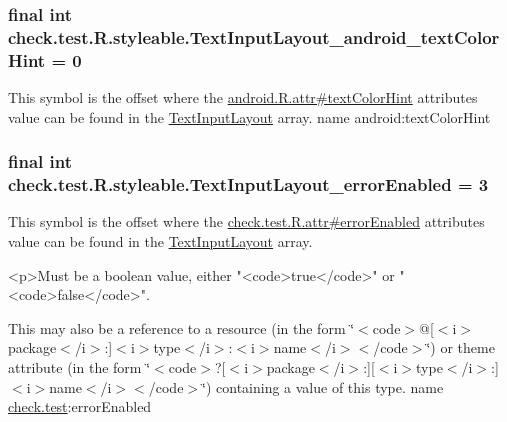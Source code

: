 \subsubsection[{Text\+Input\+Layout\+\_\+android\+\_\+text\+Color\+Hint}]{\setlength{\rightskip}{0pt plus 5cm}final int check.\+test.\+R.\+styleable.\+Text\+Input\+Layout\+\_\+android\+\_\+text\+Color\+Hint = 0\hspace{0.3cm}{\ttfamily [static]}}\label{classcheck_1_1test_1_1_r_1_1styleable_acec272e290ec4a23a75d437f8712b96a}
This symbol is the offset where the \hyperlink{}{android.\+R.\+attr\#text\+Color\+Hint} attribute\textquotesingle{}s value can be found in the \hyperlink{classcheck_1_1test_1_1_r_1_1styleable_a56e445e43589d92521fa1b8fd6e2e470}{Text\+Input\+Layout} array.  name android\+:text\+Color\+Hint \hypertarget{classcheck_1_1test_1_1_r_1_1styleable_a61fd0cbc829c3fa93cc7a808bc58231e}{}
\subsubsection[{Text\+Input\+Layout\+\_\+error\+Enabled}]{\setlength{\rightskip}{0pt plus 5cm}final int check.\+test.\+R.\+styleable.\+Text\+Input\+Layout\+\_\+error\+Enabled = 3\hspace{0.3cm}{\ttfamily [static]}}\label{classcheck_1_1test_1_1_r_1_1styleable_a61fd0cbc829c3fa93cc7a808bc58231e}
This symbol is the offset where the \hyperlink{classcheck_1_1test_1_1_r_1_1attr_ab02dbe7a6470efb4a4d469eeea265e7f}{check.\+test.\+R.\+attr\#error\+Enabled} attribute\textquotesingle{}s value can be found in the \hyperlink{classcheck_1_1test_1_1_r_1_1styleable_a56e445e43589d92521fa1b8fd6e2e470}{Text\+Input\+Layout} array.

\begin{DoxyVerb}      <p>Must be a boolean value, either "<code>true</code>" or "<code>false</code>".
\end{DoxyVerb}
 

This may also be a reference to a resource (in the form \char`\"{}$<$code$>$@\mbox{[}$<$i$>$package$<$/i$>$\+:\mbox{]}$<$i$>$type$<$/i$>$\+:$<$i$>$name$<$/i$>$$<$/code$>$\char`\"{}) or theme attribute (in the form \char`\"{}$<$code$>$?\mbox{[}$<$i$>$package$<$/i$>$\+:\mbox{]}\mbox{[}$<$i$>$type$<$/i$>$\+:\mbox{]}$<$i$>$name$<$/i$>$$<$/code$>$\char`\"{}) containing a value of this type.  name \hyperlink{namespacecheck_1_1test}{check.\+test}\+:error\+Enabled \hypertarget{classcheck_1_1test_1_1_r_1_1styleable_af1730eaed5795cdf53e63a5527d2d006}{}
